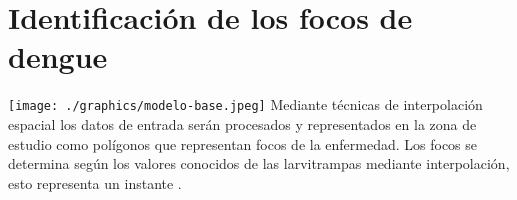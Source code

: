 

\section{Identificación de los focos de dengue}
\label{sec:solucion-instantanea}
\texttt{[image: ./graphics/modelo-base.jpeg]}
Mediante técnicas de interpolación espacial los datos de entrada serán
procesados y representados en la zona de estudio como polígonos que
representan focos de la enfermedad.
Los focos se determina según los valores conocidos de las larvitrampas
mediante interpolación, esto representa un instante \cite{AnusuyaSpeech2009}.
